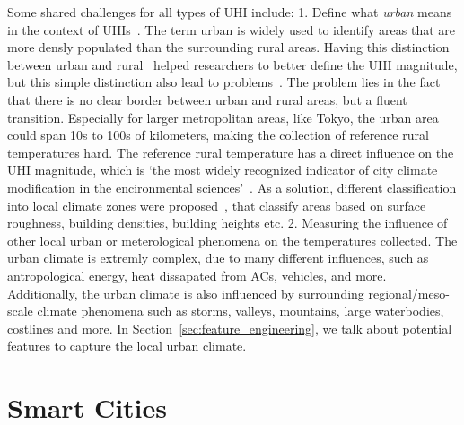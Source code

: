 Some shared challenges for all types of UHI include: 1. Define what \textit{urban} means in the context of UHIs~\cite{stewart2009newly}. The term urban is widely used to identify areas that are more densly populated than the surrounding rural areas. Having this distinction between urban and rural~\cite{lowry1977empirical} helped researchers to better define the UHI magnitude, but this simple distinction also lead to problems~\cite{stewart2011systematic}. The problem lies in the fact that there is no clear border between urban and rural areas, but a fluent transition. Especially for larger metropolitan areas, like Tokyo, the urban area could span 10s to 100s of kilometers, making the collection of reference rural temperatures hard. The reference rural temperature has a direct influence on the UHI magnitude, which is `the most widely recognized indicator of city climate modification in the encironmental sciences'~\cite{stewart2009newly}. As a solution, different classification into local climate zones were proposed~\cite{stewart2012local, stewart2009newly}, that classify areas based on surface roughness, building densities, building heights etc. 2. Measuring the influence of other local urban or meterological phenomena on the temperatures collected. The urban climate is extremly complex, due to many different influences, such as antropological energy, heat dissapated from ACs, vehicles, and more. Additionally, the urban climate is also influenced by surrounding regional/meso-scale climate phenomena such as storms, valleys, mountains, large waterbodies, costlines and more. In Section~\ref{sec:feature_engineering}, we talk about potential features to capture the local urban climate.

\section{Smart Cities}

